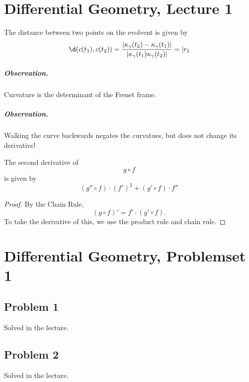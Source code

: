 \chapter{Differential Geometry, Lecture 1}

\begin{lemma}\label{DotProductDifferentiation}

\end{lemma}

\begin{lemma}\label{EvolventDistanceFormula}
    The distance between two points on the evolvent is given by
    \[
        \d (c(t_1), c(t_2) ) = \frac{ \lvert \kappa_\gamma(t_2) - \kappa_\gamma(t_1) \rvert}{\lvert \kappa_\gamma(t_1) \kappa_\gamma(t_2) \rvert } = \lvert r_1
    \]
\end{lemma}

\paragraph{Observation.} Curvature is the determinant of the Frenet frame.
\paragraph{Observation.} Walking the curve backwards negates the curvatues, but does not change its derivative!

\begin{lemma}\label{DoubleChainRule}
    The second derivative of 
    \[
        g \circ f
    \]
    is given by
    \[
        (g''\circ f)\cdot (f')^2 + (g'\circ f) \cdot f''
    \]
\end{lemma}
\begin{proof}
    By the Chain Rule,
\[
    (g\circ f)' = f' \cdot (g' \circ f).
\]
    To take the derivative of this, we use the product rule and chain rule.
\end{proof}

\chapter{Differential Geometry, Problemset 1}

\section{Problem 1}
Solved in the lecture.

\section{Problem 2}
Solved in the lecture.

